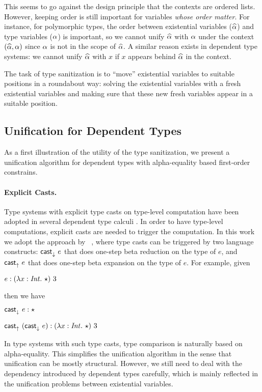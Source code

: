 This seems to go against the design principle that the
contexts are ordered lists. However, keeping order is still important for
variables \textit{whose order matter}. For instance, for polymorphic types, the
order between existential variables ($\widehat{\alpha}$) and type variables ($\alpha$) is
important, so we cannot unify $\widehat{\alpha}$ with $\alpha$ under the context $(\widehat{\alpha},
\alpha)$ since $\alpha$ is not in the scope of $\widehat{\alpha}$. A similar reason exists in
dependent type systems: we cannot unify $\widehat{\alpha}$ with $x$ if $x$ appears behind
$\widehat{\alpha}$ in the context.

The task of type sanitization is to ``move'' existential variables to suitable
positions in a roundabout way: solving the existential variables with a fresh existential variables
and making sure that these new fresh variables appear in a suitable position.

\subsection{Unification for Dependent Types}

As a first illustration of the utility of the type sanitization, we present a
unification algorithm for dependent types with alpha-equality based
first-order constrains.

\paragraph{Explicit Casts.}

Type systems with explicit type casts on type-level computation have been
adopted in several dependent type calculi \citep{van2013explicit,
  kimmell2012equational, sjoberg2012irrelevance, sjoberg2015programming,
  stump2009verified, sulzmann2007system, yang2016unified}. In order to have
type-level computations, explicit casts are needed to trigger the computation.
In this work we adopt the approach by ~\citet{yang2016unified}, where type casts
can be triggered by two language constructs: $\mathsf{cast}_\downarrow^{}~ e$ that does one-step beta
reduction on the type of $e$, and $\mathsf{cast}_\uparrow^{}~ e$ that does one-step beta expansion
on the type of $e$. For example, given

$e: (\lambda x:\mathit{Int}.~ \star) ~ 3$

\noindent then we have

$\mathsf{cast}_\downarrow^{}~ e : \star$

$\mathsf{cast}_\uparrow^{}~ (\mathsf{cast}_\downarrow^{}~ e) : (\lambda x:\mathit{Int}.~ \star) ~ 3$

In type systems with such type casts, type comparison is naturally based on alpha-equality. This
simplifies the unification algorithm in the sense that unification can be mostly
structural. However, we still need to deal with the dependency introduced by
dependent types carefully, which is mainly reflected in the unification problems
between existential variables.

